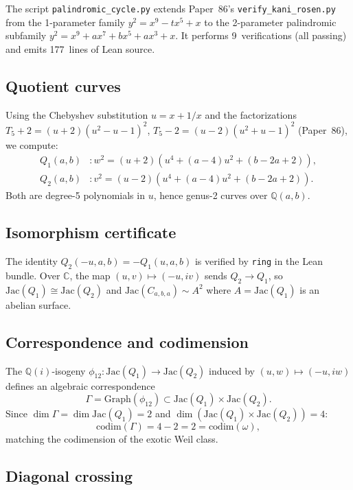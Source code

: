 \documentclass[11pt]{article}
\theoremstyle{plain}
\theoremstyle{definition}
\theoremstyle{remark}
\newcommand{\QQ}{\mathbb{Q}}
\newcommand{\CC}{\mathbb{C}}
\newcommand{\Jac}{\mathrm{Jac}}
\begin{document}
The script \texttt{palindromic\_cycle.py} extends Paper~86's
\texttt{verify\_kani\_rosen.py} from the 1-parameter family
$y^2 = x^9 - tx^5 + x$ to the 2-parameter palindromic subfamily
$y^2 = x^9 + ax^7 + bx^5 + ax^3 + x$.  It performs 9~verifications
(all passing) and emits 177~lines of Lean source.

\subsection{Quotient curves}

Using the Chebyshev substitution $u = x + 1/x$ and the factorizations
$T_5 + 2 = (u+2)(u^2 - u - 1)^2$,
$T_5 - 2 = (u-2)(u^2 + u - 1)^2$ (Paper~86), we compute:
\begin{align*}
  Q_1(a,b) &: w^2 = (u + 2)(u^4 + (a-4)u^2 + (b - 2a + 2)), \\
  Q_2(a,b) &: v^2 = (u - 2)(u^4 + (a-4)u^2 + (b - 2a + 2)).
\end{align*}
Both are degree-5 polynomials in $u$, hence genus-2 curves over
$\QQ(a,b)$.

\subsection{Isomorphism certificate}

The identity $Q_2(-u, a, b) = -Q_1(u, a, b)$ is verified by
\texttt{ring} in the Lean bundle.  Over $\CC$, the map
$(u, v) \mapsto (-u, iv)$ sends $Q_2 \to Q_1$, so
$\Jac(Q_1) \cong \Jac(Q_2)$ and $\Jac(C_{a,b,a}) \sim A^2$ where
$A = \Jac(Q_1)$ is an abelian surface.

\subsection{Correspondence and codimension}

The $\QQ(i)$-isogeny $\phi_{12}: \Jac(Q_1) \to \Jac(Q_2)$ induced
by $(u, w) \mapsto (-u, iw)$ defines an algebraic correspondence
\[
  \Gamma = \mathrm{Graph}(\phi_{12}) \subset
  \Jac(Q_1) \times \Jac(Q_2).
\]
Since $\dim \Gamma = \dim \Jac(Q_1) = 2$ and
$\dim(\Jac(Q_1) \times \Jac(Q_2)) = 4$:
\[
  \mathrm{codim}(\Gamma) = 4 - 2 = 2 = \mathrm{codim}(\omega),
\]
matching the codimension of the exotic Weil class.

\subsection{Diagonal crossing}
\end{document}
